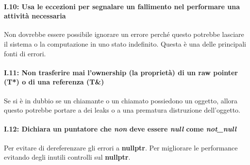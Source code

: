 \paragraph{I.10: Usa le eccezioni per segnalare un fallimento nel performare una attività necessaria}

\textsf{\small Non dovrebbe essere possibile ignorare un errore perché questo potrebbe lasciare il sistema o la computazione in uno stato indefinito. Questa è una delle principali fonti di errori.} \\

\paragraph{I.11: Non trasferire mai l'ownership (la proprietà) di un raw pointer (T*) o di una referenza (T\&)}

\textsf{\small Se si è in dubbio se un chiamante o un chiamato possiedono un oggetto, allora questo potrebbe portare a dei leaks o a una prematura distruzione dell'oggetto.} \\

\paragraph{I.12: Dichiara un puntatore che \emph{non} deve essere \emph{null} come \emph{not\_null}}

\textsf{\small Per evitare di dereferenzare gli errori a \textbf{nullptr}. Per migliorare le performance evitando degli inutili controlli sul \textbf{nullptr}.} \\

